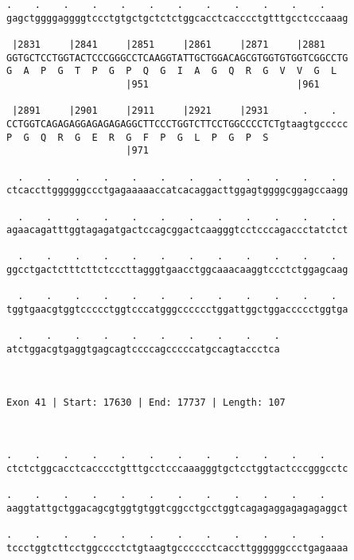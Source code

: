 \documentclass{article}
\begin{document}
\begin{Verbatim}
.    .    .    .    .    .    .    .    .    .    .    .    
gagctggggaggggtccctgtgctgctctctggcacctcacccctgtttgcctcccaaag
                                                            
 |2831     |2841     |2851     |2861     |2871     |2881    
GGTGCTCCTGGTACTCCCGGGCCTCAAGGTATTGCTGGACAGCGTGGTGTGGTCGGCCTG
G  A  P  G  T  P  G  P  Q  G  I  A  G  Q  R  G  V  V  G  L  
                     |951                          |961     
  
 |2891     |2901     |2911     |2921     |2931      .    .  
CCTGGTCAGAGAGGAGAGAGAGGCTTCCCTGGTCTTCCTGGCCCCTCTgtaagtgccccc
P  G  Q  R  G  E  R  G  F  P  G  L  P  G  P  S              
                     |971                                   
  
  .    .    .    .    .    .    .    .    .    .    .    .  
ctcaccttggggggccctgagaaaaaccatcacaggacttggagtggggcggagccaagg
                                                            
  .    .    .    .    .    .    .    .    .    .    .    .  
agaacagatttggtagagatgactccagcggactcaagggtcctcccagaccctatctct
                                                            
  .    .    .    .    .    .    .    .    .    .    .    .  
ggcctgactctttcttctcccttagggtgaacctggcaaacaaggtccctctggagcaag
                                                            
  .    .    .    .    .    .    .    .    .    .    .    .  
tggtgaacgtggtccccctggtcccatgggcccccctggattggctggaccccctggtga
                                                            
  .    .    .    .    .    .    .    .    .    .
atctggacgtgaggtgagcagtccccagcccccatgccagtaccctca
                                                
                                                
 
Exon 41 | Start: 17630 | End: 17737 | Length: 107



.    .    .    .    .    .    .    .    .    .    .    .    
ctctctggcacctcacccctgtttgcctcccaaagggtgctcctggtactcccgggcctc
                                                            
.    .    .    .    .    .    .    .    .    .    .    .    
aaggtattgctggacagcgtggtgtggtcggcctgcctggtcagagaggagagagaggct
                                                            
.    .    .    .    .    .    .    .    .    .    .    .    
tccctggtcttcctggcccctctgtaagtgcccccctcaccttggggggccctgagaaaa
                                                            

\end{Verbatim}
\end{document}
